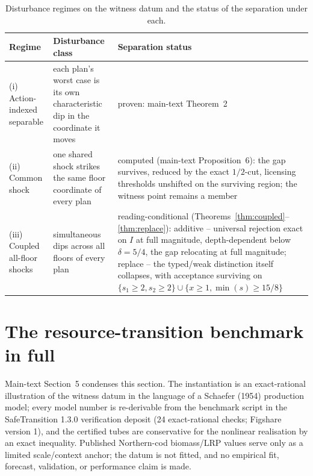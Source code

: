 \documentclass[preprint,11pt,authoryear]{elsarticle}
\theoremstyle{remark}
\begin{document}
\begin{table}[!htbp]
\centering\small
\caption{Disturbance regimes on the witness datum and the status of the separation under each.}
\label{tab:disturbance}
\begin{tabularx}{\textwidth}{@{}>{\raggedright\arraybackslash}p{}>{\raggedright\arraybackslash}p{}X@{}}
\toprule
Regime & Disturbance class & Separation status \\
\midrule
(i) Action-indexed separable & each plan's worst case is its own characteristic dip in the coordinate it moves & proven: main-text Theorem~2 \\
(ii) Common shock & one shared shock strikes the same floor coordinate of every plan & computed (main-text Proposition~6): the gap survives, reduced by the exact $1/2$-cut, licensing thresholds unshifted on the surviving region; the witness point remains a member \\
(iii) Coupled all-floor shocks & simultaneous dips across all floors of every plan & reading-conditional (Theorems~\ref{thm:coupled}--\ref{thm:replace}): additive -- universal rejection exact on $I$ at full magnitude, depth-dependent below $\delta=5/4$, the gap relocating at full magnitude; replace -- the typed/weak distinction itself collapses, with acceptance surviving on $\{s_1\ge2,s_2\ge2\}\cup\{x\ge1,\min(s)\ge15/8\}$ \\
\bottomrule
\end{tabularx}
\end{table}

\section{The resource-transition benchmark in full}\label{si:benchmark}

Main-text Section~5 condenses this section. The instantiation is an exact-rational illustration of the witness datum in the language of a Schaefer (1954) production model; every model number is re-derivable from the benchmark script in the SafeTransition 1.3.0 verification deposit (24 exact-rational checks; Figshare version 1), and the certified tubes are conservative for the nonlinear realisation by an exact inequality. Published Northern-cod biomass/LRP values serve only as a limited scale/context anchor; the datum is not fitted, and no empirical fit, forecast, validation, or performance claim is made.
\end{document}
